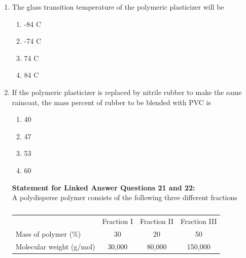 \documentclass[a4paper,10pt]{article}
\begin{document}
\begin{enumerate}
\begin{multicols}{4}
\begin{enumerate}
\item 99
\item 96
\item 93
\item 90
\end{enumerate}
\end{multicols}

\textbf{Common Data for Questions 19 and 20:} \\
The glass transition temperatures of PVC, plasticized PVC and nitrile rubber are 81 \degree C, -3 \degree C and -50 \degree C, respectively. For making a plastic raincoat, 40 mass percent of polymeric plasticizer is added to PVC.

\item The glass transition temperature of the polymeric plasticizer will be
\hfill{}

\begin{multicols}{4}
\begin{enumerate}
\item -84 \degree C
\item -74 \degree C
\item 74 \degree C
\item 84 \degree C
\end{enumerate}
\end{multicols}

\item If the polymeric plasticizer is replaced by nitrile rubber to make the same raincoat, the mass percent of rubber to be blended with PVC is
\hfill{}

\begin{multicols}{4}
\begin{enumerate}
\item 40
\item 47
\item 53
\item 60
\end{enumerate}
\end{multicols}

\textbf{Statement for Linked Answer Questions 21 and 22:} \\
A polydisperse polymer consists of the following three different fractions
\begin{table}[H]
\centering
\begin{tabular}{lccc}
 & Fraction I & Fraction II & Fraction III \\
Mass of polymer (\%) & 30 & 20 & 50 \\
Molecular weight (g/mol) & 30,000 & 80,000 & 150,000 \\
\end{tabular}
\caption*{}
\label{tab:q21_22_poly}
\end{table}


\end{enumerate}
\end{document}
